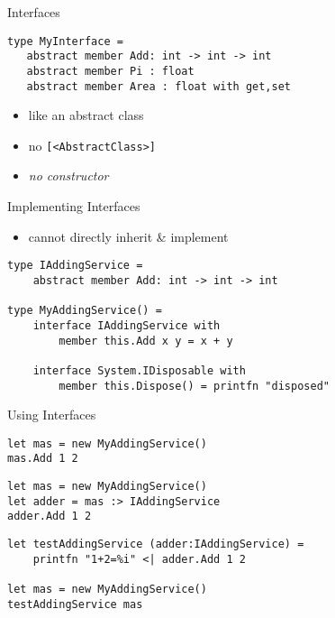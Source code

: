 \documentclass{beamer}
\begin{document}
\begin{frame}[fragile]{Interfaces}
  \begin{verbatim}
type MyInterface =
   abstract member Add: int -> int -> int
   abstract member Pi : float
   abstract member Area : float with get,set
  \end{verbatim}
  \pause
  \begin{itemize}[<+->]
    \item like an abstract class
    \item no \texttt{[<AbstractClass>]}
    \item \textit{no constructor}
  \end{itemize}
\end{frame}

\begin{frame}[fragile]{Implementing Interfaces}
  \begin{itemize}
    \item cannot directly inherit \& implement
  \end{itemize}
  \begin{verbatim}
type IAddingService =
    abstract member Add: int -> int -> int

type MyAddingService() =
    interface IAddingService with
        member this.Add x y = x + y

    interface System.IDisposable with
        member this.Dispose() = printfn "disposed"
  \end{verbatim}
\end{frame}

\begin{frame}[fragile]{Using Interfaces}
  \begin{verbatim}
let mas = new MyAddingService()
mas.Add 1 2
  \end{verbatim}
  \pause
  \begin{verbatim}
let mas = new MyAddingService()
let adder = mas :> IAddingService
adder.Add 1 2
  \end{verbatim}
  \pause
  \begin{verbatim}
let testAddingService (adder:IAddingService) =
    printfn "1+2=%i" <| adder.Add 1 2

let mas = new MyAddingService()
testAddingService mas
  \end{verbatim}
\end{frame}
\end{document}
